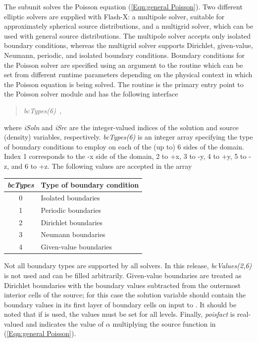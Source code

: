 The  subunit solves the Poisson equation
(\eqref{Eqn:general Poisson}).
Two different elliptic solvers are supplied with Flash-X: a multipole
solver, suitable for approximately spherical source distributions,
and a multigrid solver, which can be used with general source distributions.
The multipole solver accepts only isolated boundary conditions, whereas
the multigrid solver supports Dirichlet, given-value, Neumann,
periodic, and isolated boundary conditions. Boundary conditions for the
Poisson solver are specified using an argument to the 
routine which can be set from different runtime parameters depending on
the physical context in which the Poisson equation is being solved.
The  routine is the primary entry point to the Poisson
solver module and has the following interface
\begin{quote}
\code{, }
{\it bcTypes(6)}\code{)}~,
\end{quote}
where {\it iSoln} and {\it iSrc} are the integer-valued
indices of the solution and source (density) variables,
respectively. {\it bcTypes(6)} is an integer array specifying the
type of boundary conditions to employ on each of the (up to) 6 sides
of the domain.  Index 1 corresponds to the -x side of the domain, 2 to
+x, 3 to -y, 4 to +y, 5 to -z, and 6 to +z.  The following values are
accepted in the array
\begin{center}
\begin{tabular}{cl}
{\it bcTypes} & Type of boundary condition\\
\hline
0 & Isolated boundaries\\
1 & Periodic boundaries\\
2 & Dirichlet boundaries\\
3 & Neumann boundaries\\
4 & Given-value boundaries\\
\hline
\end{tabular}
\end{center}
Not all boundary types are supported by all solvers.  In this release, {\it
bcValues(2,6)} is not used and can be filled arbitrarily.  Given-value
boundaries are treated as Dirichlet boundaries with the boundary values
subtracted from the outermost interior cells of the source; for this case the
solution variable should contain the boundary values in its first layer of
boundary cells on input to .  It should be noted that if
 \Paramesh is used, the values must be set for all levels.  Finally,
{\it poisfact} is real-valued and indicates the value of $\alpha$ multiplying the
source function in  (\eqref{Eqn:general Poisson}).


